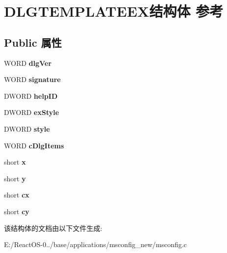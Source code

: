 \hypertarget{struct_d_l_g_t_e_m_p_l_a_t_e_e_x}{}\section{D\+L\+G\+T\+E\+M\+P\+L\+A\+T\+E\+E\+X结构体 参考}
\label{struct_d_l_g_t_e_m_p_l_a_t_e_e_x}
\subsection*{Public 属性}
\begin{DoxyCompactItemize}
\item 
\mbox{\label{struct_d_l_g_t_e_m_p_l_a_t_e_e_x_a89f5e23ff6c5651ff64dde5d14d78b91}} 
W\+O\+RD {\bfseries dlg\+Ver}
\item 
\mbox{\label{struct_d_l_g_t_e_m_p_l_a_t_e_e_x_a1894385a678557beb0f747836b397bb8}} 
W\+O\+RD {\bfseries signature}
\item 
\mbox{\label{struct_d_l_g_t_e_m_p_l_a_t_e_e_x_a322469c800958c1c313a2085d6baa878}} 
D\+W\+O\+RD {\bfseries help\+ID}
\item 
\mbox{\label{struct_d_l_g_t_e_m_p_l_a_t_e_e_x_a54f562ee715a51514bc337fcc6a12dfe}} 
D\+W\+O\+RD {\bfseries ex\+Style}
\item 
\mbox{\label{struct_d_l_g_t_e_m_p_l_a_t_e_e_x_ac5c63b24310b22117c618dc0ddba1c05}} 
D\+W\+O\+RD {\bfseries style}
\item 
\mbox{\label{struct_d_l_g_t_e_m_p_l_a_t_e_e_x_a4444d346dd5cc9823445881bd7c36532}} 
W\+O\+RD {\bfseries c\+Dlg\+Items}
\item 
\mbox{\label{struct_d_l_g_t_e_m_p_l_a_t_e_e_x_a08b3d04028753cf561af2e7312d38c92}} 
short {\bfseries x}
\item 
\mbox{\label{struct_d_l_g_t_e_m_p_l_a_t_e_e_x_ac03d752f641644dfd579dbd598568a1a}} 
short {\bfseries y}
\item 
\mbox{\label{struct_d_l_g_t_e_m_p_l_a_t_e_e_x_a98cc51a2559c213ae53745bf3ead5b4f}} 
short {\bfseries cx}
\item 
\mbox{\label{struct_d_l_g_t_e_m_p_l_a_t_e_e_x_a53fd10bc31c19f39a6014ef3ef7c9d4c}} 
short {\bfseries cy}
\end{DoxyCompactItemize}


该结构体的文档由以下文件生成\+:\begin{DoxyCompactItemize}
\item 
E\+:/\+React\+O\+S-\/0../base/applications/msconfig\+\_\+new/msconfig.\+c\end{DoxyCompactItemize}
